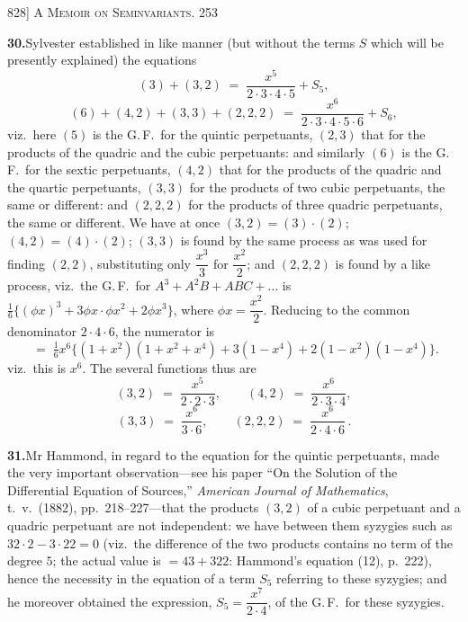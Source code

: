 \documentclass[11pt]{article}
\begin{document}
\newpage
\noindent\textsc{828] \hfill A Memoir on Seminvariants. \hfill 253}
\vspace{0.6em}

\medskip
\noindent\textbf{30.}\quad Sylvester established in like manner (but without the terms
$S$ which will be presently explained) the equations
\[
(3)+(3,2) \;=\; \frac{x^{5}}{2\cdot 3\cdot 4\cdot 5}+S_{5},
\]
\[
(6)+(4,2)+(3,3)+(2,2,2) \;=\; \frac{x^{6}}{2\cdot 3\cdot 4\cdot 5\cdot 6}+S_{6},
\]
viz.\ here $(5)$ is the G.\,F.\ for the quintic perpetuants, $(2,3)$ that for the
products of the quadric and the cubic perpetuants: and similarly $(6)$ is the G.\,F.\
for the sextic perpetuants, $(4,2)$ that for the products of the quadric and the
quartic perpetuants, $(3,3)$ for the products of two cubic perpetuants, the same or
different: and $(2,2,2)$ for the products of three quadric perpetuants, the same or
different. We have at once $(3,2)=(3)\cdot(2)$; $(4,2)=(4)\cdot(2)$; $(3,3)$ is
found by the same process as was used for finding $(2,2)$, substituting only
$\dfrac{x^{3}}{3}$ for $\dfrac{x^{2}}{2}$; and $(2,2,2)$ is found by a like process,
viz.\ the G.\,F.\ for $A^{3}+A^{2}B+ABC+\ldots$ is $\tfrac{1}{6}\bigl\{(\phi x)^{3}+3\phi x\cdot \phi x^{2}+2\phi x^{3}\bigr\}$,
where $\phi x=\dfrac{x^{2}}{2}$. Reducing to the common denominator $2\cdot 4\cdot 6$,
the numerator is
\[
\;=\;\tfrac{1}{6}x^{6}\bigl\{(1+x^{2})(1+x^{2}+x^{4})+3(1-x^{4})+2(1-x^{2})(1-x^{4})\bigr\}.
\]
viz.\ this is $x^{6}$. The several functions thus are
\[
(3,2) \;=\; \frac{x^{5}}{2\cdot 2\cdot 3},\qquad (4,2) \;=\; \frac{x^{6}}{2\cdot 3\cdot 4},
\]
\[
(3,3) \;=\; \frac{x^{6}}{3\cdot 6},\qquad (2,2,2) \;=\; \frac{x^{6}}{2\cdot 4\cdot 6}\,.
\]

\medskip
\noindent\textbf{31.}\quad Mr Hammond, in regard to the equation for the quintic
perpetuants, made the very important observation---see his paper ``On the Solution of
the Differential Equation of Sources,'' \textit{American Journal of Mathematics}, t.\ v.\
(1882), pp.\ 218--227---that the products $(3,2)$ of a cubic perpetuant and a quadric
perpetuant are not independent: we have between them syzygies such as $32\cdot 2-3\cdot 22=0$
(viz.\ the difference of the two products contains no term of the degree $5$; the
actual value is $=43+322$: Hammond's equation (12), p.\ 222), hence the necessity in
the equation of a term $S_{5}$ referring to these syzygies; and he moreover obtained
the expression, $S_{5}=\dfrac{x^{7}}{2\cdot 4}$, of the G.\,F.\ for these syzygies.
\end{document}
